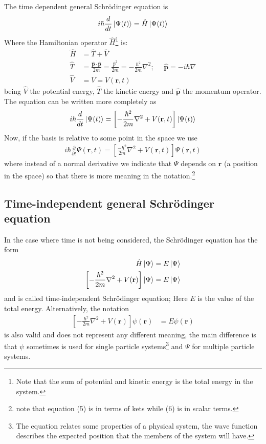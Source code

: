 \documentclass{aa}%
\begin{document}
The time dependent general Schrödinger equation\cite{1} is
\begin{gather}
	i\hbar\frac{d}{dt}\ket{\Psi(t)} = \hat{H}\ket{\Psi(t)}
\end{gather}
Where the Hamiltonian operator $\hat{H}$\footnote{Note that the sum of potential and kinetic energy is the total energy in the system.} is:
\begin{align}
	\hat{H} &= \hat{T} + \hat{V}\\
	\hat{T} &= \frac{\mathbf{\hat{p}}\cdot\mathbf{\hat{p}}}{2m} = \frac{\hat{p}^2}{2m} = -\frac{\hbar^2}{2m}\nabla^2;~~~~~~\mathbf{\hat{p}}=-i\hbar\nabla\\
	\hat{V} &= V = V(\mathbf{r},t)
\end{align}
being $\hat{V}$ the potential energy, $\hat{T}$ the kinetic energy and $\mathbf{\hat{p}}$ the momentum operator. The equation can be written more completely as
\begin{gather}
	i\hbar\frac{d}{dt}\ket{\Psi(t)} = \left[ -\frac{\hbar^2}{2m}\nabla^2 + V(\mathbf{r},t) \right] \ket{\Psi(t)}
\end{gather}
Now, if the basis is relative to some point in the space we use\cite{2}
\begin{gather}
	i\hbar\frac{\partial}{\partial t}\Psi(\mathbf{r},t) = \left[\frac{-\hbar^2}{2m}\nabla^2 + V(\mathbf{r},t) \right] \Psi(\mathbf{r},t)
\end{gather}
where instead of a normal derivative we indicate that $\Psi$ depends on $\mathbf{r}$ (a position in the space) so that there is more meaning in the notation.\footnote{note that equation (5) is in terms of kets while (6) is in scalar terms.}\\

\subsection{Time-independent general Schrödinger equation}
In the case where time is not being considered, the Schrödinger equation has the form
\begin{align}
	\hat{H}\ket{\Psi} &= E\ket{\Psi}\\
	\left[ -\frac{\hbar^2}{2m}\nabla^2 + V(\mathbf{r}) \right] \ket{\Psi} &= E\ket{\Psi}
\end{align}
and is called time-independent Schrödinger equation; Here $E$ is the value of the total energy. Alternatively, the notation
\begin{align}
	\left[ -\frac{\hbar^2}{2m}\nabla^2 + V(\mathbf{r}) \right] \psi(\mathbf{r}) &= E\psi(\mathbf{r})
\end{align}
is also valid and does not represent any different meaning, the main difference is that $\psi$ sometimes is used for single particle systems\footnote{The equation relates some properties of a physical system, the wave function describes the expected position that the members of the system will have.} and $\Psi$ for multiple particle systems.\cite{3}\\
\end{document}
